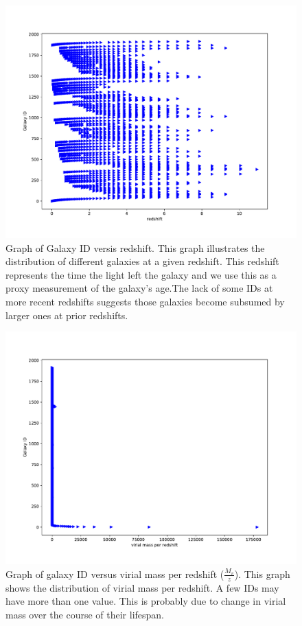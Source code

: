 \documentclass{article}
\begin{document}
\begin{figure}
  \includegraphics[width=\linewidth]{redshift.pdf}
  \caption{Graph of Galaxy ID versis redshift. This graph illustrates the distribution of different galaxies at a given redshift. This redshift represents the time the light left the galaxy and we use this as a proxy measurement of the galaxy's age.The lack of some IDs at more recent redshifts suggests those galaxies become subsumed by larger ones at prior redshifts.}
  \label{fig:redshift}
\end{figure}

\begin{figure}
  \includegraphics[width=\linewidth]{virial mass per redshift.pdf}
  \caption{Graph of galaxy ID versus virial mass per redshift ($\frac{M_v}{z}$). This graph shows the distribution of virial mass per redshift. A few IDs may have more than one value. This is probably due to change in virial mass over the course of their lifespan.}
  \label{fig:virmass_per_z}
\end{figure}
\end{document}
